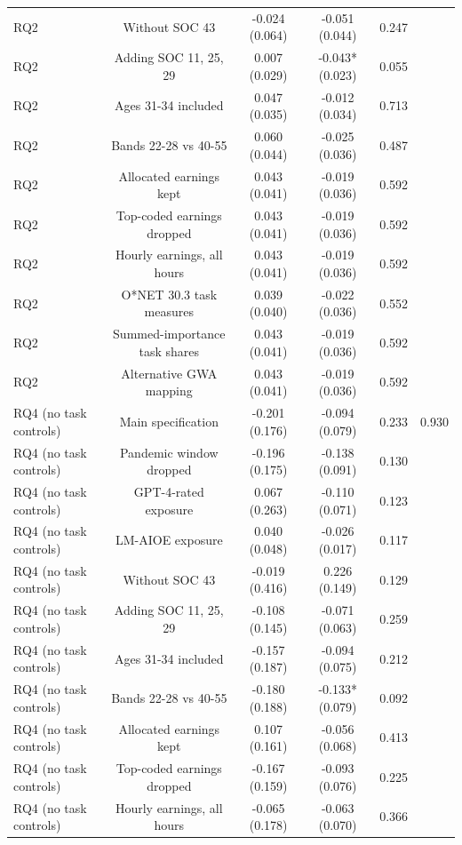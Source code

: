 \begin{table}[htbp]
\begin{tabular}{lccccc}
RQ2 & Without SOC 43 & -0.024 (0.064) & -0.051 (0.044) & 0.247 &  \\
RQ2 & Adding SOC 11, 25, 29 & 0.007 (0.029) & -0.043* (0.023) & 0.055 &  \\
RQ2 & Ages 31-34 included & 0.047 (0.035) & -0.012 (0.034) & 0.713 &  \\
RQ2 & Bands 22-28 vs 40-55 & 0.060 (0.044) & -0.025 (0.036) & 0.487 &  \\
RQ2 & Allocated earnings kept & 0.043 (0.041) & -0.019 (0.036) & 0.592 &  \\
RQ2 & Top-coded earnings dropped & 0.043 (0.041) & -0.019 (0.036) & 0.592 &  \\
RQ2 & Hourly earnings, all hours & 0.043 (0.041) & -0.019 (0.036) & 0.592 &  \\
RQ2 & O*NET 30.3 task measures & 0.039 (0.040) & -0.022 (0.036) & 0.552 &  \\
RQ2 & Summed-importance task shares & 0.043 (0.041) & -0.019 (0.036) & 0.592 &  \\
RQ2 & Alternative GWA mapping & 0.043 (0.041) & -0.019 (0.036) & 0.592 &  \\
RQ4 (no task controls) & Main specification & -0.201 (0.176) & -0.094 (0.079) & 0.233 & 0.930 \\
RQ4 (no task controls) & Pandemic window dropped & -0.196 (0.175) & -0.138 (0.091) & 0.130 &  \\
RQ4 (no task controls) & GPT-4-rated exposure & 0.067 (0.263) & -0.110 (0.071) & 0.123 &  \\
RQ4 (no task controls) & LM-AIOE exposure & 0.040 (0.048) & -0.026 (0.017) & 0.117 &  \\
RQ4 (no task controls) & Without SOC 43 & -0.019 (0.416) & 0.226 (0.149) & 0.129 &  \\
RQ4 (no task controls) & Adding SOC 11, 25, 29 & -0.108 (0.145) & -0.071 (0.063) & 0.259 &  \\
RQ4 (no task controls) & Ages 31-34 included & -0.157 (0.187) & -0.094 (0.075) & 0.212 &  \\
RQ4 (no task controls) & Bands 22-28 vs 40-55 & -0.180 (0.188) & -0.133* (0.079) & 0.092 &  \\
RQ4 (no task controls) & Allocated earnings kept & 0.107 (0.161) & -0.056 (0.068) & 0.413 &  \\
RQ4 (no task controls) & Top-coded earnings dropped & -0.167 (0.159) & -0.093 (0.076) & 0.225 &  \\
RQ4 (no task controls) & Hourly earnings, all hours & -0.065 (0.178) & -0.063 (0.070) & 0.366 &  \\

\end{tabular}
\end{table}

